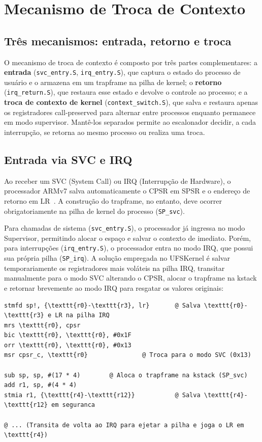 \section{Mecanismo de Troca de Contexto}


\subsection{Três mecanismos: entrada, retorno e troca}

O mecanismo de troca de contexto é composto por três partes complementares:
a \textbf{entrada} (\texttt{svc\_entry.S}, \texttt{irq\_entry.S}), que captura
o estado do processo de usuário e o armazena em um trapframe na pilha de kernel;
o \textbf{retorno} (\texttt{irq\_return.S}), que restaura esse estado e devolve
o controle ao processo; e a \textbf{troca de contexto de kernel}
(\texttt{context\_switch.S}), que salva e restaura apenas os registradores
call-preserved para alternar entre processos enquanto permanece em modo supervisor.
Mantê-los separados permite ao escalonador decidir, a cada interrupção, se
retorna ao mesmo processo ou realiza uma troca.

\subsection{Entrada via SVC e IRQ}

Ao receber um SVC (System Call) ou IRQ (Interrupção de Hardware), o processador ARMv7
salva automaticamente o CPSR em SPSR e o endereço de retorno em LR~\cite{arm:armv7ar}. 
A construção do trapframe, no entanto, deve ocorrer obrigatoriamente na pilha 
de kernel do processo (\texttt{SP\_svc}). 

Para chamadas de sistema (\texttt{svc\_entry.S}), o processador já ingressa 
no modo Supervisor, permitindo alocar o espaço e salvar o contexto de imediato.
Porém, para interrupções (\texttt{irq\_entry.S}), o processador entra no modo IRQ,
que possui sua própria pilha (\texttt{SP\_irq}). A solução empregada no UFSKernel é
salvar temporariamente os registradores mais voláteis na pilha IRQ, transitar 
manualmente para o modo SVC alterando o CPSR, alocar o trapframe na kstack e 
retornar brevemente ao modo IRQ para resgatar os valores originais:

\lstset{captionpos=t}
\begin{lstlisting}[language={[x86masm]Assembler},
                   caption={Transição de modo e resgate de registradores em \texttt{irq\_entry.S}}]
stmfd sp!, {\texttt{r0}-\texttt{r3}, lr}       @ Salva \texttt{r0}-\texttt{r3} e LR na pilha IRQ
mrs \texttt{r0}, cpsr
bic \texttt{r0}, \texttt{r0}, #0x1F
orr \texttt{r0}, \texttt{r0}, #0x13
msr cpsr_c, \texttt{r0}               @ Troca para o modo SVC (0x13)

sub sp, sp, #(17 * 4)        @ Aloca o trapframe na kstack (SP_svc)
add r1, sp, #(4 * 4)
stmia r1, {\texttt{r4}-\texttt{r12}}           @ Salva \texttt{r4}-\texttt{r12} em seguranca

@ ... (Transita de volta ao IRQ para ejetar a pilha e joga o LR em \texttt{r4})
\end{lstlisting}
\lstset{captionpos=b}

